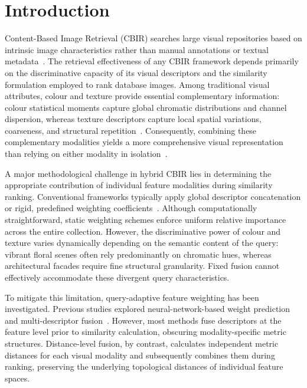 \documentclass[pdflatex,sn-mathphys-num]{sn-jnl}
\begin{document}

\maketitle

\section{Introduction}\label{sec1}
Content-Based Image Retrieval (CBIR) searches large visual repositories based on intrinsic image characteristics rather than manual annotations or textual metadata~\cite{dubey2020survey}. The retrieval effectiveness of any CBIR framework depends primarily on the discriminative capacity of its visual descriptors and the similarity formulation employed to rank database images. Among traditional visual attributes, colour and texture provide essential complementary information: colour statistical moments capture global chromatic distributions and channel dispersion, whereas texture descriptors capture local spatial variations, coarseness, and structural repetition~\cite{chun2008cbir,stricker1995similarity}. Consequently, combining these complementary modalities yields a more comprehensive visual representation than relying on either modality in isolation~\cite{singh2018color,yue2011cbir}.

A major methodological challenge in hybrid CBIR lies in determining the appropriate contribution of individual feature modalities during similarity ranking. Conventional frameworks typically apply global descriptor concatenation or rigid, predefined weighting coefficients~\cite{tyagi2026enhanced,naveen2025ai,wang2014content}. Although computationally straightforward, static weighting schemes enforce uniform relative importance across the entire collection. However, the discriminative power of colour and texture varies dynamically depending on the semantic content of the query: vibrant floral scenes often rely predominantly on chromatic hues, whereas architectural facades require fine structural granularity. Fixed fusion cannot effectively accommodate these divergent query characteristics.

To mitigate this limitation, query-adaptive feature weighting has been investigated. Previous studies explored neural-network-based weight prediction and multi-descriptor fusion~\cite{naveen2025ai,akmal2023automatic,bu2023content}. However, most methods fuse descriptors at the feature level prior to similarity calculation, obscuring modality-specific metric structures. Distance-level fusion, by contrast, calculates independent metric distances for each visual modality and subsequently combines them during ranking, preserving the underlying topological distances of individual feature spaces.
\end{document}
